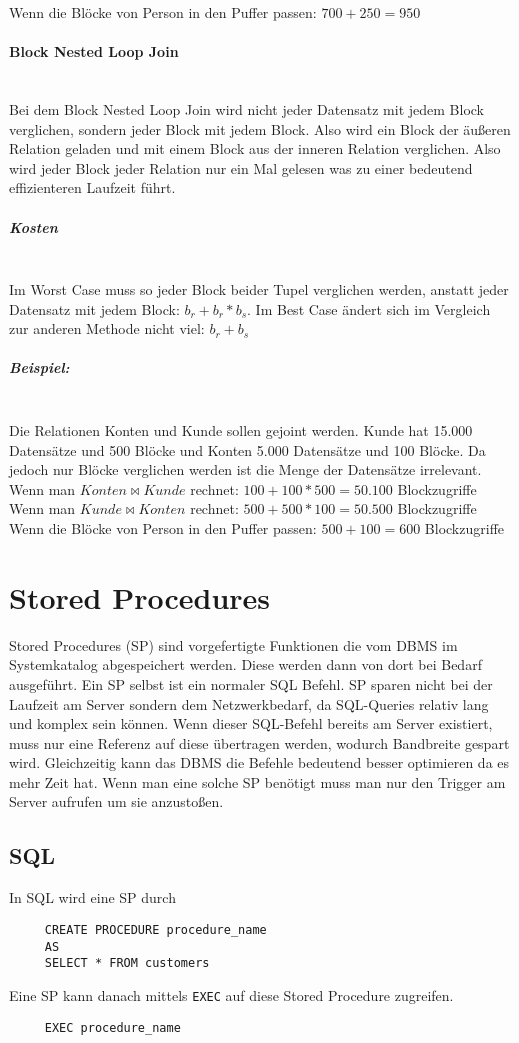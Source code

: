 \documentclass{article}
\newcommand{\paragraphlb}[1]{\paragraph{#1}\mbox{}\\}
\newcommand{\subparagraphlb}[1]{\subparagraph{#1}\mbox{}\\}
\begin{document}
	Wenn die Blöcke von Person in den Puffer passen: $700+250=950$
	\paragraphlb{Block Nested Loop Join}
	Bei dem Block Nested Loop Join wird nicht jeder Datensatz mit jedem Block verglichen, sondern jeder Block mit jedem Block. Also wird ein Block der äußeren Relation geladen und mit einem Block aus der inneren Relation verglichen. Also wird jeder Block jeder Relation nur ein Mal gelesen was zu einer bedeutend effizienteren Laufzeit führt.
	\subparagraphlb{Kosten}
	Im Worst Case muss so jeder Block beider Tupel verglichen werden, anstatt jeder Datensatz mit jedem Block: $b_r+b_r*b_s$.
	Im Best Case ändert sich im Vergleich zur anderen Methode nicht viel: $b_r+b_s$
	\subparagraphlb{Beispiel:}
	Die Relationen Konten und Kunde sollen gejoint werden. Kunde hat 15.000 Datensätze und 500 Blöcke und Konten 5.000 Datensätze und 100 Blöcke. Da jedoch nur Blöcke verglichen werden ist die Menge der Datensätze irrelevant. \\
	Wenn man $Konten\bowtie Kunde$ rechnet: $100+100*500=50.100$ Blockzugriffe \\
	Wenn man $Kunde\bowtie Konten$ rechnet: $500+500*100=50.500$ Blockzugriffe \\
	Wenn die Blöcke von Person in den Puffer passen: $500+100=600$ Blockzugriffe
	\section{Stored Procedures}
	Stored Procedures (SP) sind vorgefertigte Funktionen die vom DBMS im Systemkatalog abgespeichert werden. Diese werden dann von dort bei Bedarf ausgeführt. Ein SP selbst ist ein normaler SQL Befehl. SP sparen nicht bei der Laufzeit am Server sondern dem Netzwerkbedarf, da SQL-Queries relativ lang und komplex sein können. Wenn dieser SQL-Befehl bereits am Server existiert, muss nur eine Referenz auf diese übertragen werden, wodurch Bandbreite gespart wird. Gleichzeitig kann das DBMS die Befehle bedeutend besser optimieren da es mehr Zeit hat. Wenn man eine solche SP benötigt muss man nur den Trigger am Server aufrufen um sie anzustoßen.
	\subsection{SQL}
	In SQL wird eine SP durch
	\begin{verbatim}
	 CREATE PROCEDURE procedure_name
	 AS
	 SELECT * FROM customers
	 \end{verbatim}
	 Eine SP kann danach mittels \texttt{EXEC} auf diese Stored Procedure zugreifen.
	 \begin{verbatim}
	 EXEC procedure_name
	 \end{verbatim}
\end{document}
